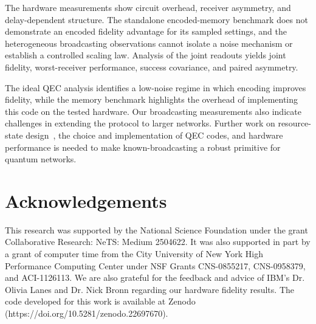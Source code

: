\documentclass[aps,physrev,10pt,twocolumn,superscriptaddress,floatfix]{revtex4-2}
\begin{document}
The hardware measurements show circuit overhead, receiver asymmetry, and delay-dependent structure. The standalone encoded-memory benchmark does not demonstrate an encoded fidelity advantage for its sampled settings, and the heterogeneous broadcasting observations cannot isolate a noise mechanism or establish a controlled scaling law. Analysis of the joint readouts yields joint fidelity, worst-receiver performance, success covariance, and paired asymmetry.

The ideal QEC analysis identifies a low-noise regime in which encoding improves fidelity, while the memory benchmark highlights the overhead of implementing this code on the tested hardware. Our broadcasting measurements also indicate challenges in extending the protocol to larger networks. Further work on resource-state design~\cite{kumar2024multiparty}, the choice and implementation of QEC codes, and hardware performance is needed to make known-broadcasting a robust primitive for quantum networks.


\section{Acknowledgements}
This research was supported by the National Science Foundation under the grant Collaborative Research: NeTS: Medium 2504622. It was also supported in part by a grant of computer time from the City University of New York High Performance Computing Center under NSF Grants CNS-0855217, CNS-0958379, and ACI-1126113. We are also grateful for the feedback and advice of IBM's Dr. Olivia Lanes and Dr. Nick Bronn regarding our hardware fidelity results. The code developed for this work is available at Zenodo (https://doi.org/10.5281/zenodo.22697670).


\end{document}
